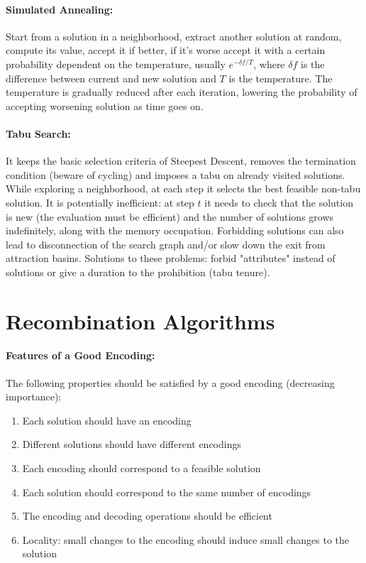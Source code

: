 \documentclass{article}
\begin{document}
	\paragraph{Simulated Annealing:} Start from a solution in a neighborhood, extract another solution at random, compute its value, accept it if better, if it's worse accept it with a certain probability dependent on the temperature, usually $e^{-\delta f / T}$, where $\delta f$ is the difference between current and new solution and $T$ is the temperature. The temperature is gradually reduced after each iteration, lowering the probability of accepting worsening solution as time goes on.\\
	
	\paragraph{Tabu Search:} It keeps the basic selection criteria of Steepest Descent, removes the termination condition (beware of cycling) and imposes a tabu on already visited solutions. While exploring a neighborhood, at each step it selects the best feasible non-tabu solution. It is potentially inefficient: at step $t$ it needs to check that the solution is new (the evaluation must be efficient) and the number of solutions grows indefinitely, along with the memory occupation. Forbidding solutions can also lead to disconnection of the search graph and/or slow down the exit from attraction basins. Solutions to these problems: forbid "attributes" instead of solutions or give a duration to the prohibition (tabu tenure).\\
	
	\section*{Recombination Algorithms}
	
	\paragraph{Features of a Good Encoding:} The following properties should be satisfied by a good encoding (decreasing importance):
	\begin{enumerate}
		\item Each solution should have an encoding
		\item Different solutions should have different encodings
		\item Each encoding should correspond to a feasible solution
		\item Each solution should correspond to the same number of encodings
		\item The encoding and decoding operations should be efficient
		\item Locality: small changes to the encoding should induce small changes to the solution
	\end{enumerate}
	
	
\end{document}
